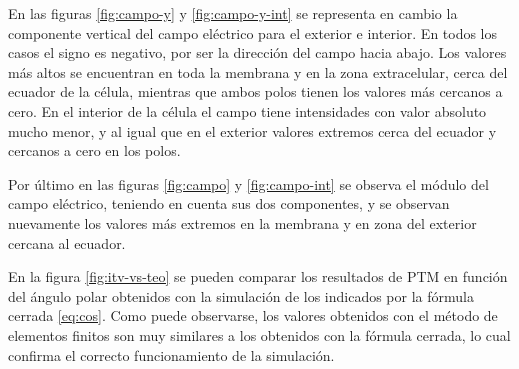 En las figuras \ref{fig:campo-y} y \ref{fig:campo-y-int} se representa en cambio la componente vertical del campo eléctrico para el exterior e interior. En todos los casos el signo es negativo, por ser la dirección del campo hacia abajo. Los valores más altos se encuentran en toda la membrana y en la zona extracelular, cerca del ecuador de la célula, mientras que ambos polos tienen los valores más cercanos a cero. En el interior de la célula el campo tiene intensidades con valor absoluto mucho menor, y al igual que en el exterior valores extremos cerca del ecuador y cercanos a cero en los polos.


Por último en las figuras \ref{fig:campo} y \ref{fig:campo-int} se observa el módulo del campo eléctrico, teniendo en cuenta sus dos componentes, y se observan nuevamente los valores más extremos en la membrana y en zona del exterior cercana al ecuador.

En la figura \ref{fig:itv-vs-teo} se pueden comparar los resultados de PTM en función del ángulo polar obtenidos con la simulación de los indicados por la fórmula cerrada \ref{eq:cos}. Como puede observarse, los valores obtenidos con el método de elementos finitos son muy similares a los obtenidos con la fórmula cerrada, lo cual confirma el correcto funcionamiento de la simulación. 

\clearpage






